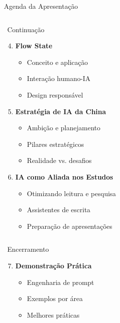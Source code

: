 \documentclass[aspectratio=169,12pt]{beamer}
\begin{document}
\begin{frame}{Agenda da Apresentação}
\begin{columns}[T]
        \begin{column}{0.5\textwidth}
            \begin{block}{\faListOl\, Continuação}
                \begin{enumerate}
                    \setcounter{enumi}{3}
                    \item<4-> \textbf{Flow State}
                    \begin{itemize}
                        \item Conceito e aplicação
                        \item Interação humano-IA
                        \item Design responsável
                    \end{itemize}

                    \item<5-> \textbf{Estratégia de IA da China}
                    \begin{itemize}
                        \item Ambição e planejamento
                        \item Pilares estratégicos
                        \item Realidade vs. desafios
                    \end{itemize}

                    \item<6-> \textbf{IA como Aliada nos Estudos}
                    \begin{itemize}
                        \item Otimizando leitura e pesquisa
                        \item Assistentes de escrita
                        \item Preparação de apresentações
                    \end{itemize}
                \end{enumerate}
            \end{block}
        \end{column}
    \end{columns}

    \begin{columns}[T]
        \begin{column}{0.5\textwidth}
            \begin{block}{\faListOl\, Encerramento}
                \begin{enumerate}
                    \setcounter{enumi}{6}
                    \item<7-> \textbf{Demonstração Prática}
                    \begin{itemize}
                        \item Engenharia de prompt
                        \item Exemplos por área
                        \item Melhores práticas
                    \end{itemize}


\end{enumerate}
\end{block}
\end{column}
\end{columns}
\end{frame}
\end{document}
